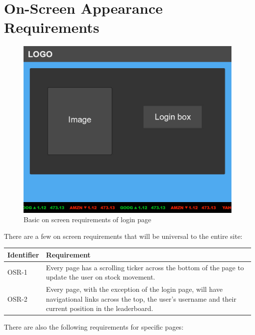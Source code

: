 \section{On-Screen Appearance Requirements}
{
\begin{figure}
\centering
\includegraphics[width=5.5in]{./img/mock/loginmock.jpg}
\caption{Basic on screen requirements of login page}
\label{ui:mockup}
\end{figure}
}

There are a few on screen requirements that will be universal to the entire site:\\
\renewcommand\arraystretch{2}
\begin{longtable}{|p{0.6in}|p{4.6in}|}
\hline
{\large \color{color1}Identifier}&{\large \color{color1}Requirement} \\ \hline

OSR-1& Every page has a scrolling ticker across the bottom of the page to update the user
on stock movement. \\ \hline

OSR-2& Every page, with the exception of the login page, will have
navigational links across the top, the user's username and their current position in
the leaderboard. \\ \hline

\end{longtable}


There are also the following requirements for specific pages:\\

